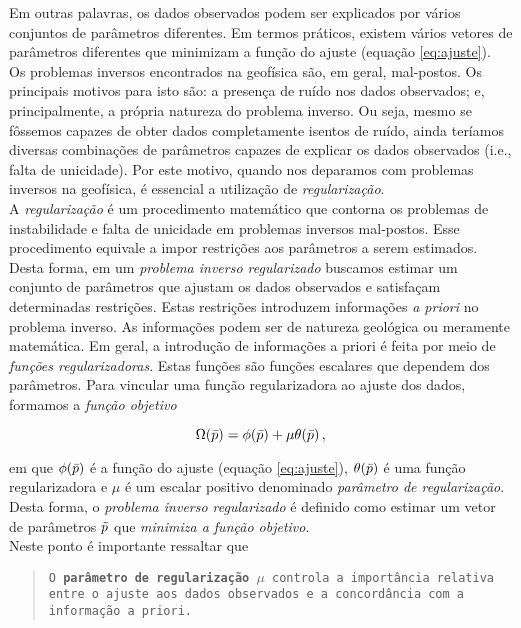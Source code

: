 \noindent Em outras palavras, os dados observados podem ser explicados por vários
conjuntos de parâmetros diferentes. Em termos práticos, existem vários vetores
de parâmetros diferentes que minimizam a função do ajuste
(equação \ref{eq:ajuste}).
\\
\indent Os problemas inversos encontrados na geofísica são, em geral, mal-postos.
Os principais motivos para isto são: a presença de ruído nos dados observados; e,
principalmente, a própria natureza do problema inverso.
Ou seja, mesmo se fôssemos capazes de obter dados completamente isentos de ruído, ainda
teríamos diversas combinações de parâmetros capazes de explicar os dados
observados (i.e., falta de unicidade).
Por este motivo, quando nos deparamos com problemas inversos na geofísica,
é essencial a utilização de {\it regularização}.
\\
\indent A {\it regularização} é um procedimento matemático que contorna os
problemas de ins\-tabilidade e falta de unicidade em problemas inversos mal-postos.
Esse procedimento equivale a impor restrições aos parâmetros a serem estimados.
Desta forma, em um {\it problema inverso regularizado} buscamos estimar um
conjunto de parâmetros que ajustam os dados observados e satisfaçam
determinadas restrições.
Estas restrições introduzem informações {\it a priori} no problema inverso.
As informações podem ser de natureza geológica ou meramente matemática.
Em geral, a introdução de informações a priori é feita por meio de {\it funções
regularizadoras}.
Estas funções são funções escalares que dependem dos parâmetros.
Para vincular uma função regularizadora ao ajuste dos dados, formamos a
{\it função objetivo}

\begin{equation}
\Omega(\bar{p}) = \phi(\bar{p}) + \mu\theta(\bar{p}) \thinspace ,
\label{eq:objetivo}
\end{equation}

\noindent em que $\phi(\bar{p})$ é a função do ajuste (equação \ref{eq:ajuste}),
$\theta(\bar{p})$ é uma função regularizadora e $\mu$ é um escalar positivo
denominado {\it parâmetro de regularização}.
Desta forma, o {\it problema inverso regularizado} é definido como estimar um
vetor de parâmetros $\tilde{p}$ que {\it minimiza a função objetivo}.
\\
\indent Neste ponto é importante ressaltar que

\begin{quote}
{\tt O {\bf parâmetro de regularização} $\mu$ controla a importância relativa
en\-tre o ajuste aos dados observados e a concordância com a infor\-ma\-ção
a priori.}
\end{quote}

